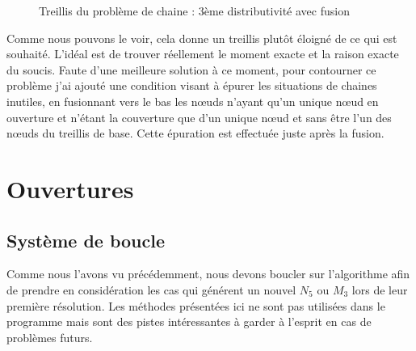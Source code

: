\begin{figure}[H]
\begin{minipage}{0.5\textwidth}
\begin{center}
	\end{center}
	\caption{Treillis du problème de chaine : 3ème distributivité avec fusion}
	\label{pbl_v6_dist3_fusion}
	\end{minipage}
\end{figure}

Comme nous pouvons le voir, cela donne un treillis plutôt éloigné de ce qui est souhaité. L'idéal est de trouver réellement le moment exacte et la raison exacte du soucis. Faute d'une meilleure solution à ce moment, pour contourner ce problème j'ai ajouté une condition visant à épurer les situations de chaines inutiles, en fusionnant vers le bas les n\oe uds n'ayant qu'un unique n\oe ud en ouverture et n'étant la couverture que d'un unique n\oe ud et sans être l'un des n\oe uds du treillis de base. Cette épuration est effectuée juste après la fusion. 

\section{Ouvertures}

\subsection{Système de boucle}

Comme nous l'avons vu précédemment, nous devons boucler sur l'algorithme afin de prendre en considération les cas qui générent un nouvel $N_5$ ou $M_3$ lors de leur première résolution. Les méthodes présentées ici ne sont pas utilisées dans le programme mais sont des pistes intéressantes à garder à l'esprit en cas de problèmes futurs.

